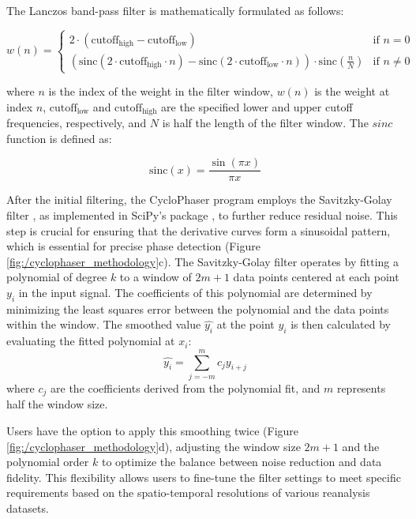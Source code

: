 The Lanczos band-pass filter is mathematically formulated as follows:

\begin{equation}
w(n) = 
\begin{cases} 
2 \cdot (\text{cutoff}_\text{high} - \text{cutoff}_\text{low}) & \text{if } n = 0 \\
\left( \text{sinc}(2 \cdot \text{cutoff}_\text{high} \cdot n) - \text{sinc}(2 \cdot \text{cutoff}_\text{low} \cdot n) \right) \cdot \text{sinc}\left(\frac{n}{N}\right) & \text{if } n \neq 0 
\end{cases}
\end{equation}


where $n$ is the index of the weight in the filter window, $w(n)$ is the weight at index $n$, $\text{cutoff}_\text{low}$ and $\text{cutoff}_\text{high}$ are the specified lower and upper cutoff frequencies, respectively, and $N$ is half the length of the filter window. The $sinc$ function is defined as:

\begin{equation}
\text{sinc}(x) = \frac{\sin(\pi x)}{\pi x}
\end{equation}

After the initial filtering, the CycloPhaser program employs the Savitzky-Golay filter \citep{savitzky1964smoothing}, as implemented in SciPy's package \citep{virtanen2020scipy}, to further reduce residual noise. This step is crucial for ensuring that the derivative curves form a sinusoidal pattern, which is essential for precise phase detection (Figure \ref{fig:/cyclophaser_methodology}c). The Savitzky-Golay filter operates by fitting a polynomial of degree \( k \) to a window of \( 2m+1 \) data points centered at each point \( y_i \) in the input signal. The coefficients of this polynomial are determined by minimizing the least squares error between the polynomial and the data points within the window. The smoothed value \( \hat{y_i} \) at the point \( y_i \) is then calculated by evaluating the fitted polynomial at \( x_i \):
\[
\hat{y_i} = \sum_{j=-m}^{m} c_j y_{i+j}
\]
where \( c_j \) are the coefficients derived from the polynomial fit, and \( m \) represents half the window size.

Users have the option to apply this smoothing twice (Figure \ref{fig:/cyclophaser_methodology}d), adjusting the window size \( 2m+1 \) and the polynomial order \( k \) to optimize the balance between noise reduction and data fidelity. This flexibility allows users to fine-tune the filter settings to meet specific requirements based on the spatio-temporal resolutions of various reanalysis datasets.

